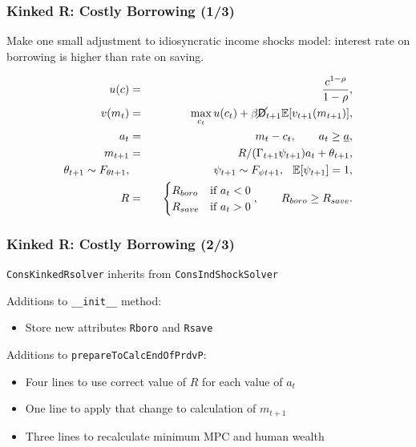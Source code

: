\documentclass[11ptt]{beamer}
\begin{document}
\begin{frame}
  \frametitle{Kinked R: Costly Borrowing (1/3)}
  Make one small adjustment to idiosyncratic income shocks model: interest rate on borrowing is higher than rate on saving.

  \begin{eqnarray*}
    u(c) &=& \frac{c^{1-\rho}}{1-\rho}, \\
    v(m_t) &=& \max_{c_t} u(c_t) + \beta \cancel{\mathsf{D}}_{t+1} \mathbb{E} [v_{t+1}(m_{t+1}) ], \\
    a_t &=& m_t - c_t, \qquad a_t \geq \underline{a}, \\
    m_{t+1} &=& R/(\Gamma_{t+1} \psi_{t+1}) a_t + \theta_{t+1}, \\
    \theta_{t+1} \sim F_{\theta t+1}, &\qquad& \psi_{t+1} \sim F_{\psi t+1}, \hspace{0.25cm} \mathbb{E}[\psi_{t+1}] = 1, \\
    R &=& \begin{cases}
      R_{boro} & \text{if  } a_t < 0 \\
      R_{save} & \text{if  } a_t > 0
    \end{cases}, \qquad R_{boro} \geq R_{save}.
  \end{eqnarray*}
\end{frame}


\begin{frame}
  \frametitle{Kinked R: Costly Borrowing (2/3)}
  \texttt{ConsKinkedRsolver} inherits from \texttt{ConsIndShockSolver}

  \begin{block}{Additions to \texttt{\_\_init\_\_} method:}
    \begin{itemize}
    \item Store new attributes \texttt{Rboro} and \texttt{Rsave}
    \end{itemize}
  \end{block}
  \begin{block}{Additions to \texttt{prepareToCalcEndOfPrdvP}:}
    \begin{itemize}
    \item Four lines to use correct value of $R$ for each value of $a_t$

    \item One line to apply that change to calculation of $m_{t+1}$

    \item Three lines to recalculate minimum MPC and human wealth
    \end{itemize}
  \end{block}
\end{frame}
\end{document}
